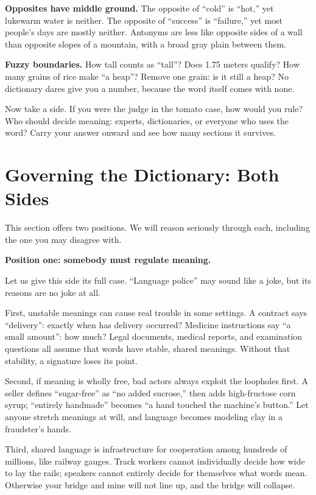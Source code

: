\textbf{Opposites have middle ground.} The opposite of ``cold'' is ``hot,'' yet lukewarm water is neither. The opposite of ``success'' is ``failure,'' yet most people's days are mostly neither. Antonyms are less like opposite sides of a wall than opposite slopes of a mountain, with a broad gray plain between them.

\textbf{Fuzzy boundaries.} How tall counts as ``tall''? Does 1.75 meters qualify? How many grains of rice make ``a heap''? Remove one grain: is it still a heap? No dictionary dares give you a number, because the word itself comes with none.

Now take a side. If you were the judge in the tomato case, how would you rule? Who should decide meaning: experts, dictionaries, or everyone who uses the word? Carry your answer onward and see how many sections it survives.

\section{Governing the Dictionary: Both Sides}
This section offers two positions. We will reason seriously through each, including the one you may disagree with.

\textbf{Position one: somebody must regulate meaning.}

Let us give this side its full case. ``Language police'' may sound like a joke, but its reasons are no joke at all.

First, unstable meanings can cause real trouble in some settings. A contract says ``delivery'': exactly when has delivery occurred? Medicine instructions say ``a small amount'': how much? Legal documents, medical reports, and examination questions all assume that words have stable, shared meanings. Without that stability, a signature loses its point.

Second, if meaning is wholly free, bad actors always exploit the loopholes first. A seller defines ``sugar-free'' as ``no added sucrose,'' then adds high-fructose corn syrup; ``entirely handmade'' becomes ``a hand touched the machine's button.'' Let anyone stretch meanings at will, and language becomes modeling clay in a fraudster's hands.

Third, shared language is infrastructure for cooperation among hundreds of millions, like railway gauges. Track workers cannot individually decide how wide to lay the rails; speakers cannot entirely decide for themselves what words mean. Otherwise your bridge and mine will not line up, and the bridge will collapse.

